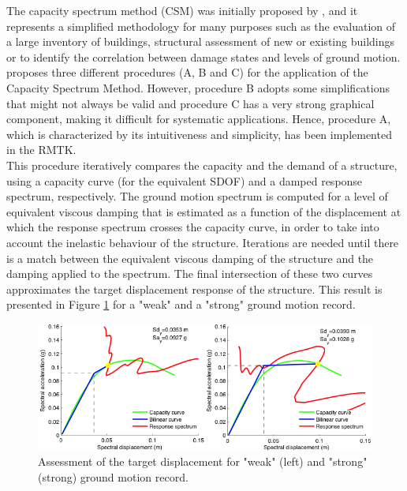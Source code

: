 The capacity spectrum method (CSM) was initially proposed by \citep{FreemanEtAl1975}, and it represents a simplified methodology for many purposes such as the evaluation of a large inventory of buildings, structural assessment of new or existing buildings or to identify the correlation between damage states and levels of ground motion. \cite{ATC1996} proposes three different procedures (A, B and C) for the application of the Capacity Spectrum Method. However, procedure B adopts some simplifications that might not always be valid and procedure C has a very strong graphical component, making it difficult for systematic applications. Hence, procedure A, which is characterized by its intuitiveness and simplicity, has been implemented in the RMTK.\\

This procedure iteratively compares the capacity and the demand of a structure, using a capacity curve (for the equivalent SDOF) and a damped response spectrum, respectively. The ground motion spectrum is computed for a level of equivalent viscous damping that is estimated as a function of the displacement at which the response spectrum crosses the capacity curve, in order to take into account the inelastic behaviour of the structure. Iterations are needed until there is a match between the equivalent viscous damping of the structure and the damping applied to the spectrum. The final intersection of these two curves approximates the target displacement response of the structure. This result is presented in Figure \ref{fig:per_point} for a "weak" and a "strong" ground motion record. \\

\begin{figure}[htb]
  \centering
      \includegraphics[width=12cm]{Figures/performance_points.png}
  \caption{Assessment of the target displacement for "weak" (left) and "strong" (strong) ground motion record.}
  \label{fig:per_point}
\end{figure}


